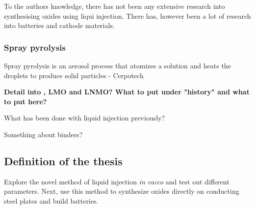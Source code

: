 \documentclass[Main/main.tex]{subfiles}
\begin{document}
To the authors knowledge, there has not been any extensive research into synthesising oxides using liqui injection. There has, however been a lot of research into batteries and cathode materials. 

\subsubsection{Spray pyrolysis}
Spray pyrolysis is an aerosol process that atomizes a solution and heats the droplets to produce solid particles
- Cerpotech

\textbf{Detail into , LMO and LNMO?
What to put under "history" and what to put here?}


What has been done with liquid injection previously?


Something about binders?




\subsection{Definition of the thesis}

Explore the novel method of liquid injection \textit{in vacco} and test out different parameters. Next, use this method to synthesize oxides directly on conducting steel plates and build batteries.
\end{document}
